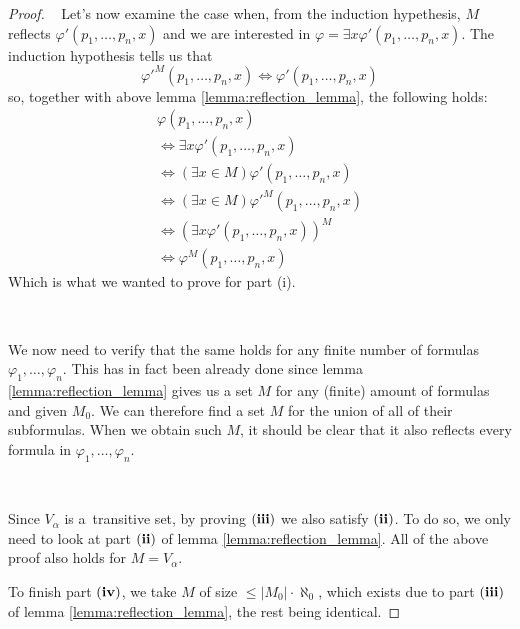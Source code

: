 \begin{proof}
\
Let's now examine the case when, from the induction hypethesis, $M$ reflects $\varphi'(p_1, \ldots, p_n, x)$ and we are interested in $\varphi = \exists x \varphi'(p_1, \ldots, p_n, x)$.
The induction hypothesis tells us that 
\begin{equation}
\varphi'^M(p_1, \ldots, p_n, x) \iff \varphi'(p_1, \ldots, p_n, x)
\end{equation}
so, together with above lemma \ref{lemma:reflection_lemma}, the following holds:
\begin{equation}
\begin{gathered}
\varphi(p_1, \ldots, p_n, x) \\
\iff \exists x \varphi'(p_1, \ldots, p_n, x) \\
\iff (\exists x \in M) \varphi'(p_1, \ldots, p_n, x) \\
\iff (\exists x \in M) \varphi'^M (p_1, \ldots, p_n, x) \\
\iff (\exists x \varphi'(p_1, \ldots, p_n, x))^M \\
\iff \varphi^M(p_1, \ldots, p_n, x)
\end{gathered}
\end{equation}
Which is what we wanted to prove for part (i). %

\

We now need to verify that the same holds for any finite number of formulas $\varphi_1, \ldots, \varphi_n$. 
This has in fact been already done since lemma \ref{lemma:reflection_lemma} gives us a set $M$ for any (finite) amount of formulas and given $M_0$. We can therefore find a set $M$ for the union of all of their subformulas. When we obtain such $M$, it should be clear that it also reflects every formula in $\varphi_1, \ldots, \varphi_n$.

\

Since $V_\alpha$ is a~transitive set, by proving $\bold{(iii)}$ we also satisfy $\bold{(ii)}$. To do so, we only need to look at part $\bold{(ii)}$ of lemma \ref{lemma:reflection_lemma}. All of the above proof also holds for $M = V_\alpha$. 

To finish part $\bold{(iv)}$, we take $M$ of size $\leq |M_0| \cdot \aleph_0$, which exists due to part $\bold{(iii)}$ of lemma \ref{lemma:reflection_lemma}, the rest being identical.
\end{proof}

